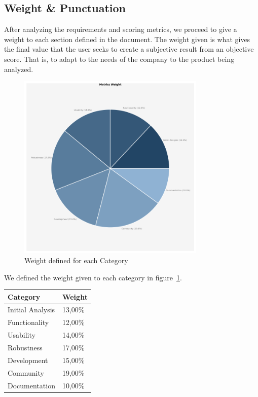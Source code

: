 \documentclass[11pt]{scrartcl}
\begin{document}
\subsection{Weight \& Punctuation}

After analyzing the requirements and scoring metrics, we proceed to give a weight to each section defined in the document. The weight given is what gives the final value that the user seeks to create a subjective result from an objective score. That is, to adapt to the needs of the company to the product being analyzed.

\begin{figure}[H]
\begin{center}
  \includegraphics[width=0.8\textwidth]{libcsvanaly2/generations/metrics-piechart.png}
  \caption{Weight defined for each Category}
  \label{fig:weight-metrics}
\end{center}
\end{figure}

We defined the weight given to each category in figure~\ref{fig:weight-metrics}.

\begin{table}[H]
\centering
\begin{tabular}{|l|l|}
    \hline Category & Weight\\
    \hline Initial Analysis	 & 13,00\%\\
    \hline Functionality & 12,00\%\\
    \hline Usability & 14,00\%\\
    \hline Robustness & 17,00\%\\
    \hline Development & 15,00\%\\
    \hline Community & 19,00\%\\
    \hline Documentation & 10,00\%\\
    \hline
\end{tabular}
\end{table}
\end{document}
